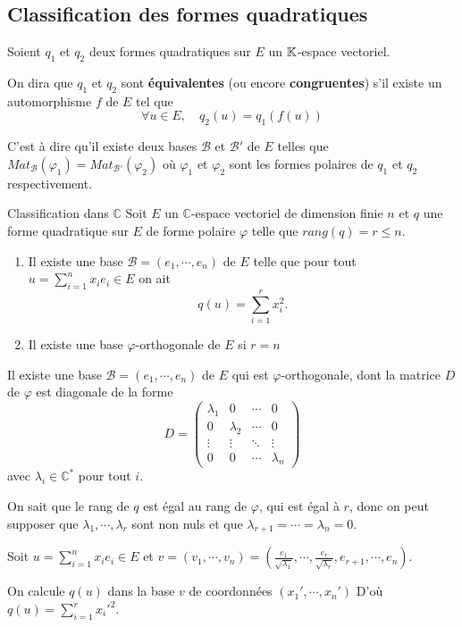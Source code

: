 \documentclass[a4paper,12pt]{article}
\begin{document}
\clearpage

\subsection{Classification des formes quadratiques}

\begin{definition}
    Soient $q_1$ et $q_2$ deux formes quadratiques sur $E$ un $\mathbb{K}$-espace vectoriel.

    On dira que $q_1$ et $q_2$ sont \textbf{équivalentes} (ou encore \textbf{congruentes}) s'il existe un automorphisme $f$ de $E$ tel que
    $$
    \forall u \in E, \quad q_2(u) = q_1(f(u))
    $$

    C'est à dire qu'il existe deux bases $\mathcal{B}$ et $\mathcal{B}'$ de $E$ telles que $Mat_{\mathcal{B}}(\varphi_1) = Mat_{\mathcal{B}'}(\varphi_2)$ où $\varphi_1$ et $\varphi_2$ sont les formes polaires de $q_1$ et $q_2$ respectivement.
\end{definition}

\begin{theoreme}{Classification dans $\mathbb{C}$}{}
    Soit $E$ un $\mathbb{C}$-espace vectoriel de dimension finie $n$ et $q$ une forme quadratique sur $E$ de forme polaire $\varphi$ telle que $rang(q) = r \leq n$.

    \begin{enumerate}
        \item
        Il existe une base $\mathcal{B} = (e_1, \cdots, e_n)$ de $E$ telle que
        pour tout $u = \sum\limits_{i=1}^n x_i e_i \in E$ on ait
        $$
        q(u) = \sum_{i=1}^r x_i^2.
        $$

        \item Il existe une base $\varphi$-orthogonale de $E$ si $r = n$
    \end{enumerate}
\end{theoreme}

\begin{demonstration}
    Il existe une base $\mathcal{B} = (e_1, \cdots, e_n)$ de $E$ qui est $\varphi$-orthogonale,
    dont la matrice $D$ de $\varphi$ est diagonale de la forme
    $$
    D = \begin{pmatrix}\lambda_1 & 0 & \cdots & 0 \\
    0 & \lambda_2 & \cdots & 0 \\
    \vdots & \vdots & \ddots & \vdots \\
    0 & 0 & \cdots & \lambda_n
    \end{pmatrix}
    $$
    avec $\lambda_i \in \mathbb{C}^*$ pour tout $i$.

    On sait que le rang de $q$ est égal au rang de $\varphi$, qui est égal à $r$, donc on peut supposer que $\lambda_1, \cdots, \lambda_r$ sont non nuls et que $\lambda_{r+1} = \cdots = \lambda_n = 0$.

    Soit $u = \sum\limits_{i=1}^n x_i e_i \in E$ et $v = (v_1, \cdots, v_n) = (\frac{e_1}{\sqrt{\lambda_1}}, \cdots, \frac{e_r}{\sqrt{\lambda_r}}, e_{r+1}, \cdots, e_n)$.

    On calcule $q(u)$ dans la base $v$ de coordonnées $(x_1' , \cdots, x_n')$
    D'où $q(u) = \sum\limits_{i=1}^r x_i'^2$.
\end{demonstration}
\end{document}
